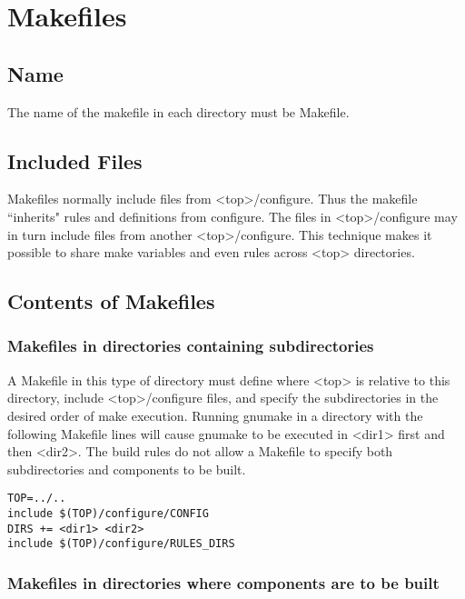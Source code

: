 \section{Makefiles}

\subsection{Name}

The name of the makefile in each directory must be Makefile.

\subsection{Included Files}

Makefiles normally include files from \textless{}top\textgreater{}/configure. Thus the makefile ``inherits" rules and definitions from configure. 
The files in \textless{}top\textgreater{}/configure may in turn include files from another \textless{}top\textgreater{}/configure. This technique makes it possible to 
share make variables and even rules across \textless{}top\textgreater{} directories.

\subsection{Contents of Makefiles}

\subsubsection{Makefiles in directories containing subdirectories}

A Makefile in this type of directory must define where \textless{}top\textgreater{} is relative to this directory, include \textless{}top\textgreater{}/configure files, 
and specify the subdirectories in the desired order of make execution. Running gnumake in a directory with the following 
Makefile lines will cause gnumake to be executed in \textless{}dir1\textgreater{} first and then \textless{}dir2\textgreater{}. The build rules do not allow a Makefile 
to specify both subdirectories and components to be built.

\begin{verbatim}TOP=../..
include $(TOP)/configure/CONFIG
DIRS += <dir1> <dir2>
include $(TOP)/configure/RULES_DIRS

\end{verbatim}\subsubsection{Makefiles in directories where components are to be built}

